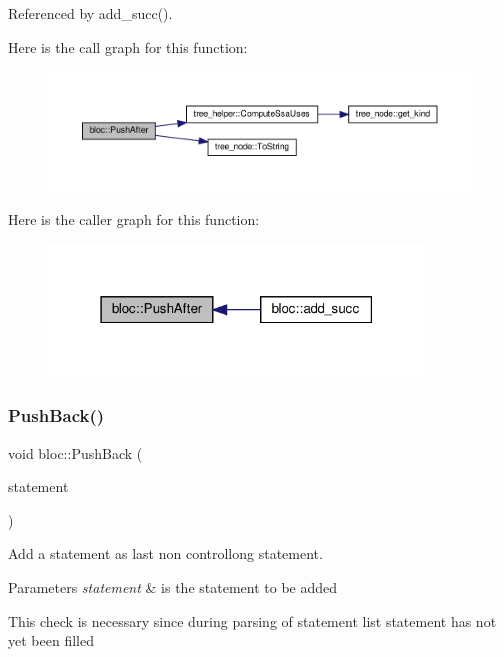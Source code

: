 Referenced by add\+\_\+succ().

Here is the call graph for this function\+:
\nopagebreak
\begin{figure}[H]
\begin{center}
\leavevmode
\includegraphics[width=350pt]{d6/df6/structbloc_a8469a1745da35d47c60c64bedb455d99_cgraph}
\end{center}
\end{figure}
Here is the caller graph for this function\+:
\nopagebreak
\begin{figure}[H]
\begin{center}
\leavevmode
\includegraphics[width=283pt]{d6/df6/structbloc_a8469a1745da35d47c60c64bedb455d99_icgraph}
\end{center}
\end{figure}
\mbox{\label{structbloc_ae5b558b58df6da7f27f07bc64eac9c68}} 
\subsubsection{\texorpdfstring{Push\+Back()}{PushBack()}}
{\footnotesize\ttfamily void bloc\+::\+Push\+Back (\begin{DoxyParamCaption}\item[{const \hyperlink{tree__node_8hpp_a6ee377554d1c4871ad66a337eaa67fd5}{tree\+\_\+node\+Ref}}]{statement }\end{DoxyParamCaption})}



Add a statement as last non controllong statement. 


\begin{DoxyParams}{Parameters}
{\em statement} & is the statement to be added \\
\hline
\end{DoxyParams}
This check is necessary since during parsing of statement list statement has not yet been filled 

